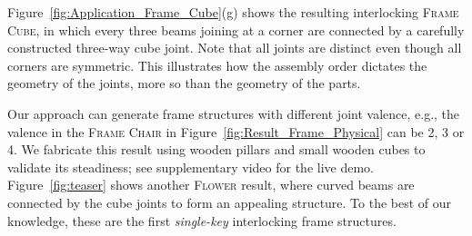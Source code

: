 Figure~\ref{fig:Application_Frame_Cube}(g) shows the resulting interlocking \textsc{Frame Cube}, in which every three beams joining at a corner are connected by a carefully constructed three-way cube joint. Note that all joints are distinct even though all corners are symmetric. This illustrates how the assembly order dictates the geometry of the joints, more so than the geometry of the parts.

Our approach can generate frame structures with different joint valence, e.g., the valence in the \textsc{Frame Chair} in Figure~\ref{fig:Result_Frame_Physical} can be 2, 3 or 4.
We fabricate this result using wooden pillars and small wooden cubes to validate its steadiness; see supplementary video for the live demo.
Figure~\ref{fig:teaser} shows another \textsc{Flower} result, where curved beams are connected by the cube joints to form an appealing structure.
To the best of our knowledge, these are the first {\em single-key} interlocking frame structures.





